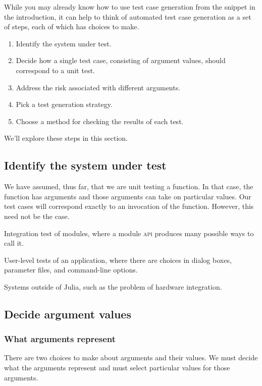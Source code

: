 \documentclass{juliacon}
\begin{document}
While you may already know how to use test case generation from the snippet in the introduction, it can help to think of automated test case generation as a set of steps, each of which has choices to make.
\begin{enumerate}
   \item Identify the system under test.
   \item Decide how a single test case, consisting of argument values, should correspond to a unit test.
   \item Address the risk associated with different arguments.
   \item Pick a test generation strategy.
   \item Choose a method for checking the results of each test.
\end{enumerate}
We'll explore these steps in this section.

\subsection{Identify the system under test}

We have assumed, thus far, that we are unit testing a function. In that case, the function has arguments and those arguments can take on particular values. Our test cases will correspond exactly to an invocation of the function. However, this need not be the case.

\begin{unnumlist}
\item Integration test of modules, where a module \textsc{api} produces many possible ways to call it.
\item User-level tests of an application, where there are choices in dialog boxes, parameter files, and command-line options.
\item Systems outside of Julia, such as the problem of hardware integration.
\end{unnumlist}

\subsection{Decide argument values}

\subsubsection{What arguments represent}
There are two choices to make about arguments and their values. We must decide what the arguments represent and must select particular values for those arguments.
\end{document}
